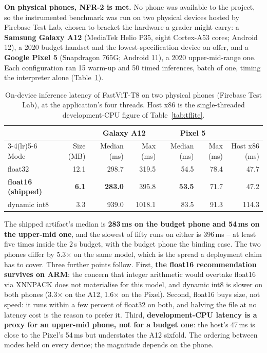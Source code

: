 \documentclass{article}
\begin{document}
\textbf{On physical phones, NFR-2 is met.} No phone was available to the project, so the instrumented
benchmark was run on two physical devices hosted by Firebase Test Lab, chosen to bracket the hardware a
grader might carry: a \textbf{Samsung Galaxy A12} (MediaTek Helio P35, eight Cortex-A53 cores; Android 12),
a 2020 budget handset and the lowest-specification device on offer, and a \textbf{Google Pixel 5}
(Snapdragon 765G; Android 11), a 2020 upper-mid-range one. Each configuration ran 15 warm-up and 50 timed
inferences, batch of one, timing the interpreter alone (Table~\ref{tab:device}).

\begin{table}[t]
\centering
\caption{On-device inference latency of FastViT-T8 on two physical phones (Firebase Test Lab), at the
application's four threads. Host x86 is the single-threaded development-CPU figure of
Table~\ref{tab:tflite}.}
\label{tab:device}
\begin{tabular}{@{}lrrrrrr@{}}
\toprule
 & & \multicolumn{2}{c}{Galaxy A12} & \multicolumn{2}{c}{Pixel 5} & \\
\cmidrule(lr){3-4}\cmidrule(lr){5-6}
Mode & Size (MB) & Median (ms) & Max (ms) & Median (ms) & Max (ms) & Host x86 (ms) \\
\midrule
float32 & 12.1 & 298.7 & 319.5 & 54.5 & 78.4 & 47.7 \\
\textbf{float16 (shipped)} & \textbf{6.1} & \textbf{283.0} & 395.8 & \textbf{53.5} & 71.7 & 47.2 \\
dynamic int8 & 3.3 & 939.0 & 1018.1 & 83.5 & 91.3 & 114.3 \\
\bottomrule
\end{tabular}
\end{table}

The shipped artifact's median is \textbf{283\,ms on the budget phone and 54\,ms on the upper-mid one}, and
the slowest of fifty runs on either is 396\,ms -- at least five times inside the 2\,s budget, with the
budget phone the binding case. The two phones differ by 5.3$\times$ on the same model, which is the spread a
deployment claim has to cover. Three further points follow. First, \textbf{the float16 recommendation
survives on ARM}: the concern that integer arithmetic would overtake float16 via XNNPACK does not
materialise for this model, and dynamic int8 is slower on both phones (3.3$\times$ on the A12,
1.6$\times$ on the Pixel). Second, float16 buys size, not speed: it runs within a few percent of float32 on
both, and halving the file at no latency cost is the reason to prefer it. Third, \textbf{development-CPU
latency is a proxy for an upper-mid phone, not for a budget one}: the host's 47\,ms is close to the
Pixel's 54\,ms but understates the A12 sixfold. The ordering between modes held on every device; the
magnitude depends on the phone.
\end{document}
